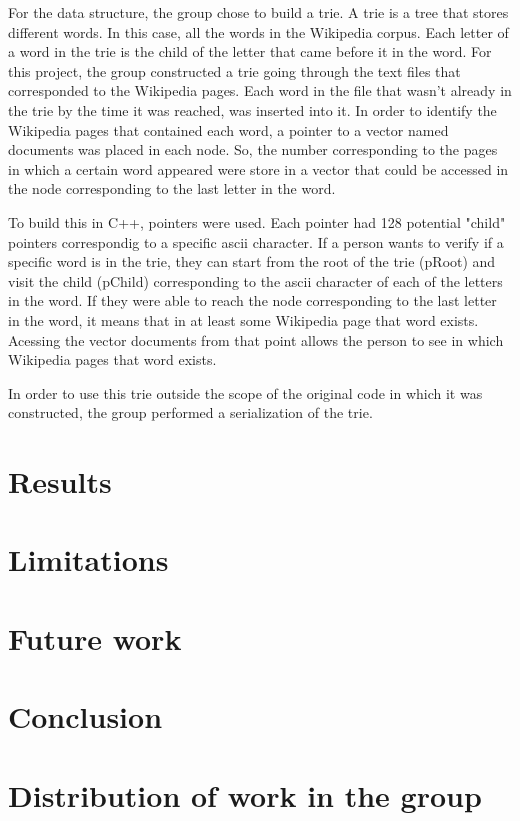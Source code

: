 \documentclass{article}
\begin{document}
For the data structure, the group chose to build a trie. A trie is a tree that stores different words. In this case, all the words in the Wikipedia corpus. Each letter of a word in the trie is the child of the letter that came before it in the word. 
For this project, the group constructed a trie going through the text files that corresponded to the Wikipedia pages. Each word in the file that wasn't already in the trie by the time it was reached, was inserted into it. In order to identify the Wikipedia pages that contained each word, a pointer to a vector named documents was placed in each node. So, the number corresponding to the pages in which a certain word appeared were store in a vector that could be accessed in the node corresponding to the last letter in the word. 


To build this in C++, pointers were used. Each pointer had 128 potential "child" pointers correspondig to a specific ascii character. If a person wants to verify if a specific word is in the trie, they can start from the root of the trie (pRoot) and visit the child (pChild) corresponding to the ascii character of each of the letters in the word. If they were able to reach the node corresponding to the last letter in the word, it means that in at least some Wikipedia page that word exists. Acessing the vector documents from that point allows the person to see in which Wikipedia pages that word exists.

In order to use this trie outside the scope of the original code in which it was constructed, the group performed a serialization of the trie. 





\section*{Results}

\section*{Limitations}
\section*{Future work}
\section*{Conclusion}
\section*{Distribution of work in the group}
\end{document}
